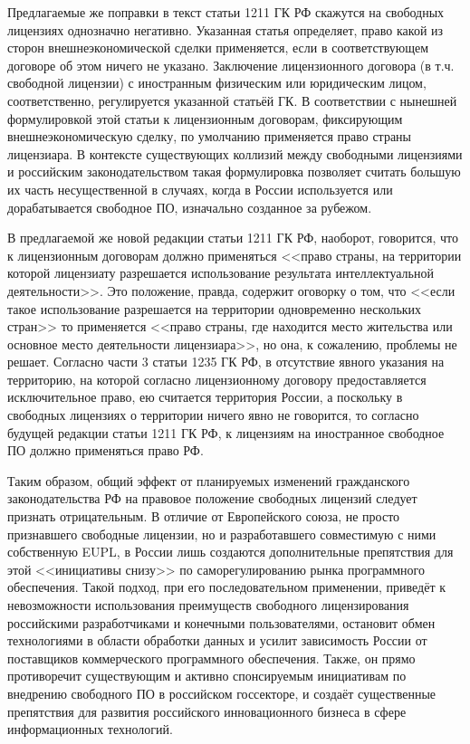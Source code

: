 \documentclass[10pt, a5paper]{article}
\begin{document}
Предлагаемые же поправки в текст статьи 1211 ГК РФ скажутся на свободных лицензиях однозначно негативно. Указанная статья определяет, право какой из сторон внешнеэкономической сделки применяется, если в соответствующем договоре об этом ничего не указано. Заключение лицензионного договора (в т.ч. свободной лицензии) с иностранным физическим или юридическим лицом, соответственно, регулируется указанной статьёй ГК. В соответствии с нынешней формулировкой этой статьи к лицензионным договорам, фиксирующим внешнеэкономическую сделку, по умолчанию применяется право страны лицензиара. В контексте существующих коллизий между свободными лицензиями и российским законодательством такая формулировка позволяет считать большую их часть несущественной в случаях, когда в России используется или дорабатывается свободное ПО, изначально созданное за рубежом.

В предлагаемой же новой редакции статьи 1211 ГК РФ, наоборот, говорится, что к лицензионным договорам должно применяться <<право страны, на территории которой лицензиату разрешается использование результата интеллектуальной деятельности>>. Это положение, правда, содержит оговорку о том, что <<если такое использование разрешается на территории одновременно нескольких стран>> то применяется <<право страны, где находится место жительства или основное место деятельности лицензиара>>, но она, к сожалению, проблемы не решает. Согласно части 3 статьи 1235 ГК РФ, в отсутствие явного указания на территорию, на которой согласно лицензионному договору предоставляется исключительное право, ею считается территория России, а поскольку в свободных лицензиях о территории ничего явно не говорится, то согласно будущей редакции статьи 1211 ГК РФ, к лицензиям на иностранное свободное ПО должно применяться право РФ.

Таким образом, общий эффект от планируемых изменений гражданского законодательства РФ на правовое положение свободных лицензий следует признать отрицательным. В отличие от Европейского союза, не просто признавшего свободные лицензии, но и разработавшего совместимую с ними собственную EUPL, в России лишь создаются дополнительные препятствия для этой <<инициативы снизу>> по саморегулированию рынка программного обеспечения. Такой подход, при его последовательном применении, приведёт к невозможности использования преимуществ свободного лицензирования российскими разработчиками и конечными пользователями, остановит обмен технологиями в области обработки данных и усилит зависимость России от поставщиков коммерческого программного обеспечения. Также, он прямо противоречит существующим и активно спонсируемым инициативам по внедрению свободного ПО в российском госсекторе, и создаёт существенные препятствия для развития российского инновационного бизнеса в сфере информационных технологий.
\end{document}
